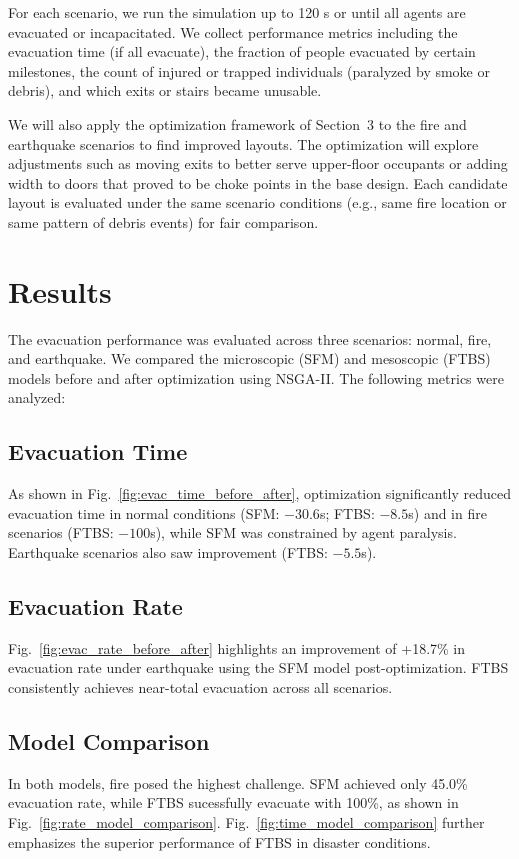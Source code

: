 \documentclass[11pt,a4paper]{article}
\begin{document}
For each scenario, we run the simulation up to 120 s or until all agents are evacuated or incapacitated. We collect performance metrics including the evacuation time (if all evacuate), the fraction of people evacuated by certain milestones, the count of injured or trapped individuals (paralyzed by smoke or debris), and which exits or stairs became unusable.

We will also apply the optimization framework of Section~3 to the fire and earthquake scenarios to find improved layouts. The optimization will explore adjustments such as moving exits to better serve upper-floor occupants or adding width to doors that proved to be choke points in the base design. Each candidate layout is evaluated under the same scenario conditions (e.g., same fire location or same pattern of debris events) for fair comparison.

\section{Results}

The evacuation performance was evaluated across three scenarios: normal, fire, and earthquake. We compared the microscopic (SFM) and mesoscopic (FTBS) models before and after optimization using NSGA-II. The following metrics were analyzed:

\subsection{Evacuation Time}
As shown in Fig.~\ref{fig:evac_time_before_after}, optimization significantly reduced evacuation time in normal conditions (SFM: $-30.6$s; FTBS: $-8.5$s) and in fire scenarios (FTBS: $-100$s), while SFM was constrained by agent paralysis. Earthquake scenarios also saw improvement (FTBS: $-5.5$s).

\subsection{Evacuation Rate}
Fig.~\ref{fig:evac_rate_before_after} highlights an improvement of +18.7\% in evacuation rate under earthquake using the SFM model post-optimization. FTBS consistently achieves near-total evacuation across all scenarios.

\subsection{Model Comparison}
In both models, fire posed the highest challenge. SFM achieved only 45.0\% evacuation rate, while FTBS sucessfully evacuate with 100\%, as shown in Fig.~\ref{fig:rate_model_comparison}. Fig.~\ref{fig:time_model_comparison} further emphasizes the superior performance of FTBS in disaster conditions.
\end{document}
